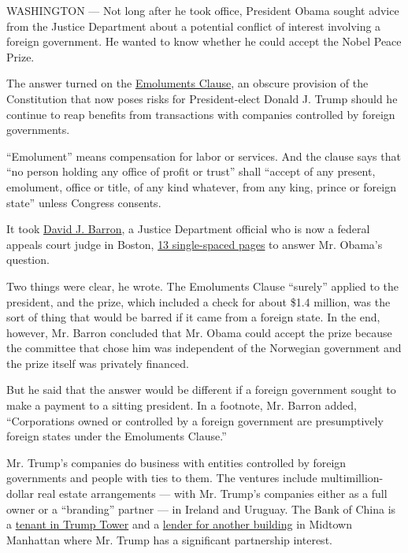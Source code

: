 WASHINGTON --- Not long after he took office, President Obama sought
advice from the Justice Department about a potential conflict of
interest involving a foreign government. He wanted to know whether he
could accept the Nobel Peace Prize.

The answer turned on the
\href{http://www.heritage.org/constitution/\#!/articles/1/essays/68/emoluments-clause}{Emoluments
Clause}, an obscure provision of the Constitution that now poses risks
for President-elect Donald J. Trump should he continue to reap benefits
from transactions with companies controlled by foreign governments.

``Emolument'' means compensation for labor or services. And the clause
says that ``no person holding any office of profit or trust'' shall
``accept of any present, emolument, office or title, of any kind
whatever, from any king, prince or foreign state'' unless Congress
consents.

It took \href{http://www.ca1.uscourts.gov/david-j-barron}{David J.
Barron}, a Justice Department official who is now a federal appeals
court judge in Boston,
\href{https://www.justice.gov/sites/default/files/olc/opinions/2009/12/31/emoluments-nobel-peace.pdf}{13
single-spaced pages} to answer Mr. Obama's question.

Two things were clear, he wrote. The Emoluments Clause ``surely''
applied to the president, and the prize, which included a check for
about \$1.4 million, was the sort of thing that would be barred if it
came from a foreign state. In the end, however, Mr. Barron concluded
that Mr. Obama could accept the prize because the committee that chose
him was independent of the Norwegian government and the prize itself was
privately financed.

But he said that the answer would be different if a foreign government
sought to make a payment to a sitting president. In a footnote, Mr.
Barron added, ``Corporations owned or controlled by a foreign government
are presumptively foreign states under the Emoluments Clause.''

Mr. Trump's companies do business with entities controlled by foreign
governments and people with ties to them. The ventures include
multimillion-dollar real estate arrangements --- with Mr. Trump's
companies either as a full owner or a ``branding'' partner --- in
Ireland and Uruguay. The Bank of China is a
\href{http://www.nytimes.com/2016/11/15/us/politics/donald-trump-holdings-conflict-of-interest.html}{tenant
in Trump Tower} and a
\href{http://www.nytimes.com/2016/08/21/us/politics/donald-trump-debt.html}{lender
for another building} in Midtown Manhattan where Mr. Trump has a
significant partnership interest.

